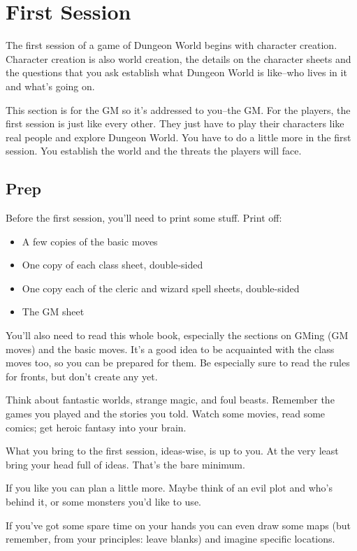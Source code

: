\chapter{First Session}


 The first session of a game of Dungeon World begins with character creation. Character creation is also world creation, the details on the character sheets and the questions that you ask establish what Dungeon World is like--who lives in it and what's going on.


 This section is for the GM so it's addressed to you--the GM. For the players, the first session is just like every other. They just have to play their characters like real people and explore Dungeon World. You have to do a little more in the first session. You establish the world and the threats the players will face.
\section{Prep}


 Before the first session, you'll need to print some stuff. Print off:
\begin{itemize}
\item A few copies of the basic moves
\item One copy of each class sheet, double-sided
\item One copy each of the cleric and wizard spell sheets, double-sided
\item The GM sheet

\end{itemize}


 You'll also need to read this whole book, especially the sections on GMing (GM moves) and the basic moves. It's a good idea to be acquainted with the class moves too, so you can be prepared for them. Be especially sure to read the rules for fronts, but don't create any yet.


 Think about fantastic worlds, strange magic, and foul beasts. Remember the games you played and the stories you told. Watch some movies, read some comics; get heroic fantasy into your brain.


 What you bring to the first session, ideas-wise, is up to you. At the very least bring your head full of ideas. That's the bare minimum.


 If you like you can plan a little more. Maybe think of an evil plot and who's behind it, or some monsters you'd like to use.


 If you've got some spare time on your hands you can even draw some maps (but remember, from your principles: leave blanks) and imagine specific locations.


